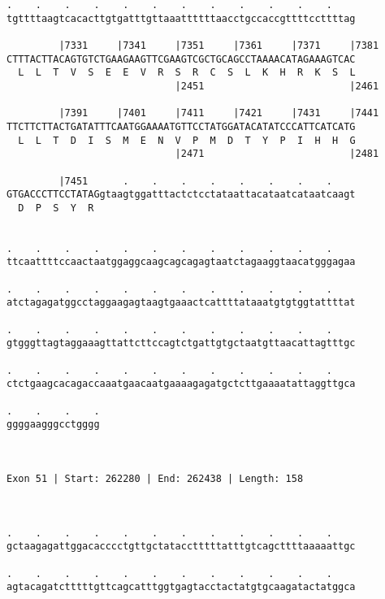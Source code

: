 \documentclass{article}
\begin{document}
\begin{Verbatim}
.    .    .    .    .    .    .    .    .    .    .    .    
tgttttaagtcacacttgtgatttgttaaattttttaacctgccaccgttttccttttag
                                                            
         |7331     |7341     |7351     |7361     |7371     |7381
CTTTACTTACAGTGTCTGAAGAAGTTCGAAGTCGCTGCAGCCTAAAACATAGAAAGTCAC
  L  L  T  V  S  E  E  V  R  S  R  C  S  L  K  H  R  K  S  L
                             |2451                         |2461
  
         |7391     |7401     |7411     |7421     |7431     |7441
TTCTTCTTACTGATATTTCAATGGAAAATGTTCCTATGGATACATATCCCATTCATCATG
  L  L  T  D  I  S  M  E  N  V  P  M  D  T  Y  P  I  H  H  G
                             |2471                         |2481
  
         |7451      .    .    .    .    .    .    .    .    
GTGACCCTTCCTATAGgtaagtggatttactctcctataattacataatcataatcaagt
  D  P  S  Y  R                                             
                                                            
  
.    .    .    .    .    .    .    .    .    .    .    .    
ttcaattttccaactaatggaggcaagcagcagagtaatctagaaggtaacatgggagaa
                                                            
.    .    .    .    .    .    .    .    .    .    .    .    
atctagagatggcctaggaagagtaagtgaaactcattttataaatgtgtggtattttat
                                                            
.    .    .    .    .    .    .    .    .    .    .    .    
gtgggttagtaggaaagttattcttccagtctgattgtgctaatgttaacattagtttgc
                                                            
.    .    .    .    .    .    .    .    .    .    .    .    
ctctgaagcacagaccaaatgaacaatgaaaagagatgctcttgaaaatattaggttgca
                                                            
.    .    .    .
ggggaagggcctgggg
                
                
 
Exon 51 | Start: 262280 | End: 262438 | Length: 158



.    .    .    .    .    .    .    .    .    .    .    .    
gctaagagattggacacccctgttgctatacctttttatttgtcagcttttaaaaattgc
                                                            
.    .    .    .    .    .    .    .    .    .    .    .    
agtacagatctttttgttcagcatttggtgagtacctactatgtgcaagatactatggca
                                                            

\end{Verbatim}
\end{document}
